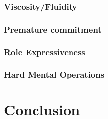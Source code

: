 \documentclass{sig-alternate}
\begin{document}
\subsubsection{Viscosity/Fluidity}

\subsubsection{Premature commitment}

\subsubsection{Role Expressiveness}

\subsubsection{Hard Mental Operations}

\section{Conclusion}





\end{document}
